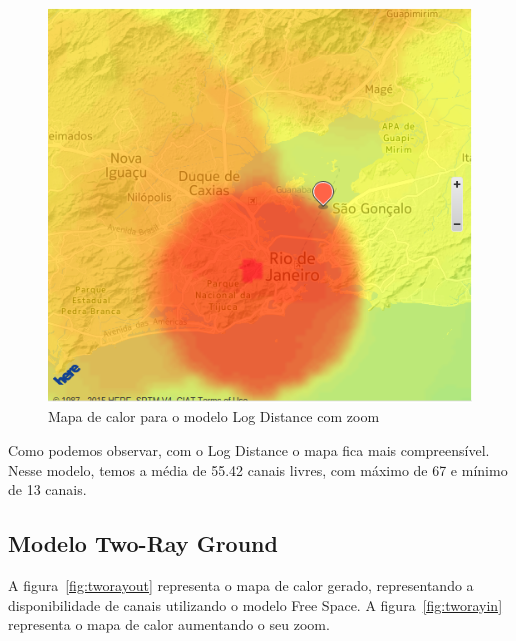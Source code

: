 \begin{figure}[htb]
\centering
\includegraphics[width=1.0\textwidth]{figs/logdistancein}
\caption[Mapa de calor para o modelo Log Distance com zoom]
{Mapa de calor para o modelo Log Distance com zoom}
\label{fig:logdistancein}
\end{figure} 

\FloatBarrier

Como podemos observar, com o Log Distance o mapa fica mais compreensível. Nesse modelo, temos a média de 55.42 canais livres, com máximo de 67 e mínimo de 13 canais.

\subsection{Modelo Two-Ray Ground}

A figura~\ref{fig:tworayout} representa o mapa de calor gerado, representando a disponibilidade de canais utilizando o modelo Free Space. A figura~\ref{fig:tworayin} representa o mapa de calor aumentando o seu zoom.

